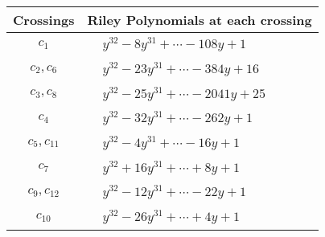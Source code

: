 \documentclass[1p]{elsarticle_modified}
\theoremstyle{definition}
\begin{document}
\begin{tabular}{m{50pt}|m{274pt}}
Crossings & \hspace{64pt}Riley Polynomials at each crossing \\
\hline $$\begin{aligned}c_{1}\end{aligned}$$&$\begin{aligned}
&y^{32}-8 y^{31}+\cdots-108 y+1
\end{aligned}$\\
\hline $$\begin{aligned}c_{2},c_{6}\end{aligned}$$&$\begin{aligned}
&y^{32}-23 y^{31}+\cdots-384 y+16
\end{aligned}$\\
\hline $$\begin{aligned}c_{3},c_{8}\end{aligned}$$&$\begin{aligned}
&y^{32}-25 y^{31}+\cdots-2041 y+25
\end{aligned}$\\
\hline $$\begin{aligned}c_{4}\end{aligned}$$&$\begin{aligned}
&y^{32}-32 y^{31}+\cdots-262 y+1
\end{aligned}$\\
\hline $$\begin{aligned}c_{5},c_{11}\end{aligned}$$&$\begin{aligned}
&y^{32}-4 y^{31}+\cdots-16 y+1
\end{aligned}$\\
\hline $$\begin{aligned}c_{7}\end{aligned}$$&$\begin{aligned}
&y^{32}+16 y^{31}+\cdots+8 y+1
\end{aligned}$\\
\hline $$\begin{aligned}c_{9},c_{12}\end{aligned}$$&$\begin{aligned}
&y^{32}-12 y^{31}+\cdots-22 y+1
\end{aligned}$\\
\hline $$\begin{aligned}c_{10}\end{aligned}$$&$\begin{aligned}
&y^{32}-26 y^{31}+\cdots+4 y+1
\end{aligned}$\\
\hline
\end{tabular}\\~\\
\end{document}
